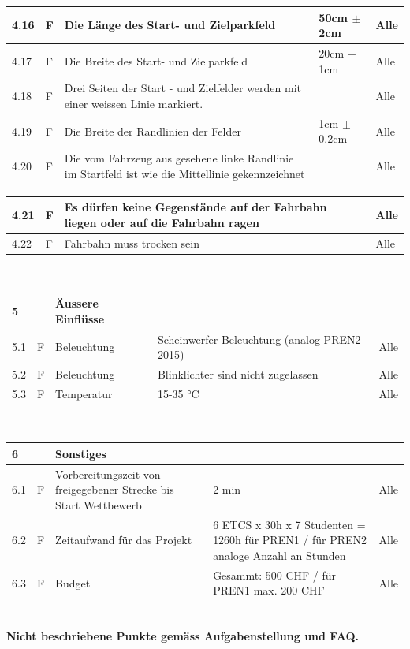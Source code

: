 \begin{center}
\begin{tabular}{|p{1cm}|p{0.5cm}|p{5cm}|p{5cm}|p{1.5cm}|}
 4.16 & F & Die Länge des Start- und Zielparkfeld & 50cm $\pm$ 2cm & Alle\\ \hline
 4.17 & F & Die Breite des Start- und Zielparkfeld & 20cm $\pm$ 1cm & Alle\\ \hline
 4.18 & F & Drei Seiten der Start - und Zielfelder werden mit einer weissen Linie markiert. & & Alle\\ \hline
 4.19 & F & Die Breite der Randlinien der Felder & 1cm $\pm$ 0.2cm & Alle\\ \hline
 4.20 & F & Die vom Fahrzeug aus gesehene linke Randlinie im Startfeld ist wie die Mittellinie gekennzeichnet & & Alle\\\hline
 \end{tabular}
 \newpage
\begin{tabular}{|p{1cm}|p{0.5cm}|p{5cm}|p{5cm}|p{1.5cm}|}\hline
 4.21 & F & Es dürfen keine Gegenstände auf der Fahrbahn liegen oder auf die Fahrbahn ragen & & Alle\\\hline
 4.22 & F & Fahrbahn muss trocken sein & & Alle \\\hline
\end{tabular}\\[0.3cm]
\begin{tabular}{|p{1cm}|p{0.5cm}|p{5cm}|p{5cm}|p{1.5cm}|}\hline
 \textbf{5} & & \textbf{Äussere Einflüsse} & & \\\hline
 5.1 & F & Beleuchtung & Scheinwerfer Beleuchtung (analog PREN2 2015) & Alle\\\hline
 5.2 & F & Beleuchtung & Blinklichter sind nicht zugelassen & Alle\\\hline
 5.3 & F & Temperatur & 15-35 °C & Alle \\\hline
 \end{tabular}\\[0.3cm]
 \begin{tabular}{|p{1cm}|p{0.5cm}|p{5cm}|p{5cm}|p{1.5cm}|}\hline
 \textbf{6} & & \textbf{Sonstiges} & & \\\hline
 6.1 & F & Vorbereitungszeit von freigegebener Strecke bis Start Wettbewerb & 2 min & Alle \\\hline
 6.2 & F & Zeitaufwand für das Projekt & 6 ETCS x 30h x 7 Studenten = 1260h für PREN1 / für PREN2 analoge Anzahl an Stunden & Alle \\\hline
 6.3 & F & Budget & Gesammt: 500 CHF / für PREN1 max. 200 CHF & Alle \\\hline
 \end{tabular}\\[0.3cm]
 \textbf{Nicht beschriebene Punkte gemäss Aufgabenstellung und FAQ.}
\end{center}

